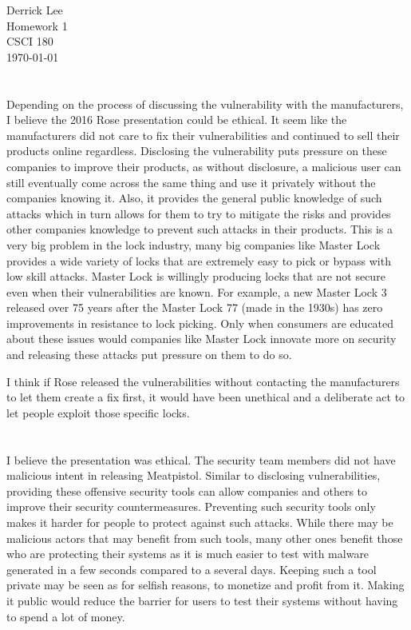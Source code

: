\documentclass[12pt]{exam}
\begin{document}
\noindent
Derrick Lee\\
Homework 1\\
CSCI 180\\
\today\\

\section{}

Depending on the process of discussing the vulnerability with the manufacturers,
I believe the 2016 Rose presentation could be ethical.  It seem like the
manufacturers did not care to fix their vulnerabilities and continued to sell
their products online regardless.  Disclosing the vulnerability puts pressure on
these companies to improve their products, as without disclosure, a malicious
user can still eventually come across the same thing and use it privately
without the companies knowing it.  Also, it provides the general public
knowledge of such attacks which in turn allows for them to try to mitigate the
risks and provides other companies knowledge to prevent such attacks in their
products.  This is a very big problem in the lock industry, many big companies
like Master Lock provides a wide variety of locks that are extremely easy to
pick or bypass with low skill attacks.  Master Lock is willingly producing locks
that are not secure even when their vulnerabilities are known.  For example, a
new Master Lock 3 released over 75 years after the Master Lock 77 (made in the
1930s) has zero improvements in resistance to lock picking.  Only when consumers
are educated about these issues would companies like Master Lock innovate more
on security and releasing these attacks put pressure on them to do so.

I think if Rose released the vulnerabilities without contacting the
manufacturers to let them create a fix first, it would have been unethical and a
deliberate act to let people exploit those specific locks.

\section{}

I believe the presentation was ethical.  The security team members did not have
malicious intent in releasing Meatpistol.  Similar to disclosing
vulnerabilities, providing these offensive security tools can allow companies
and others to improve their security countermeasures.  Preventing such security
tools only makes it harder for people to protect against such attacks.  While
there may be malicious actors that may benefit from such tools, many other ones
benefit those who are protecting their systems as it is much easier to test with
malware generated in a few seconds compared to a several days.  Keeping such a
tool private may be seen as for selfish reasons, to monetize and profit from it.
Making it public would reduce the barrier for users to test their systems
without having to spend a lot of money. 
\end{document}
